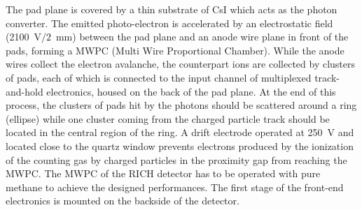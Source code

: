The pad plane
 is covered by a thin substrate of CsI which
acts as the photon converter. The emitted photo-electron is
accelerated by an electrostatic field (2100~V$/2$~mm) 
between the pad plane and
an anode wire plane in front of the pads,
 forming a MWPC (Multi Wire Proportional Chamber). 
While the anode wires collect the electron avalanche, the counterpart 
ions are collected by clusters of pads, each of which is connected to the
input channel of multiplexed track-and-hold electronics, housed on the
back of the pad plane.
At the end of this process, the
clusters of pads hit by the photons should be
scattered around a ring (ellipse) while 
one cluster coming from the charged particle track
should be located in the central region of the ring.
A drift electrode operated at 250~V and located close to the quartz window
prevents electrons produced by the ionization of the counting gas by charged 
particles in the proximity gap from reaching the MWPC. The MWPC of the RICH detector 
has to be operated with pure methane to achieve the 
designed performances. The first stage of the front-end electronics is mounted on the 
backside of the detector. 

